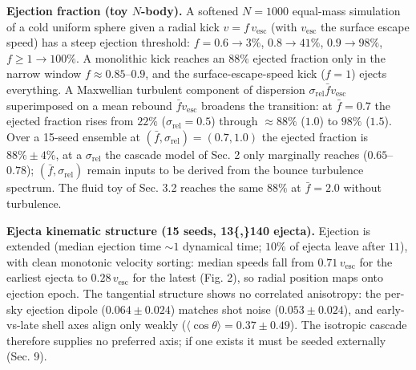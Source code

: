 \documentclass[
  11pt,
]{article}
\begin{document}
\textbf{Ejection fraction (toy \(N\)-body).} A softened \(N = 1000\)
equal-mass simulation of a cold uniform sphere given a radial kick
\(v = f\,v_{\text{esc}}\) (with \(v_{\text{esc}}\) the surface escape
speed) has a steep ejection threshold: \(f = 0.6 \to 3\%\),
\(0.8 \to 41\%\), \(0.9 \to 98\%\), \(f \geq 1 \to 100\%\). A monolithic
kick reaches an \(88\%\) ejected fraction only in the narrow window
\(f \approx 0.85\)--\(0.9\), and the surface-escape-speed kick
(\(f = 1\)) ejects everything. A Maxwellian turbulent component of
dispersion \(\sigma_{\text{rel}}\bar{f}v_{\text{esc}}\) superimposed on
a mean rebound \(\bar{f}v_{\text{esc}}\) broadens the transition: at
\(\bar{f} = 0.7\) the ejected fraction rises from \(22\%\)
(\(\sigma_{\text{rel}} = 0.5\)) through \(\approx 88\%\) (\(1.0\)) to
\(98\%\) (\(1.5\)). Over a 15-seed ensemble at
\((\bar{f}, \sigma_{\text{rel}}) = (0.7, 1.0)\) the ejected fraction is
\(88\% \pm 4\%\), at a \(\sigma_{\text{rel}}\) the cascade model of Sec.
2 only marginally reaches (\(0.65\)--\(0.78\));
\((\bar{f}, \sigma_{\text{rel}})\) remain inputs to be derived from the
bounce turbulence spectrum. The fluid toy of Sec. 3.2 reaches the same
\(88\%\) at \(\bar{f} = 2.0\) without turbulence.

\textbf{Ejecta kinematic structure (15 seeds, 13\{,\}140 ejecta).}
Ejection is extended (median ejection time \(\sim\!1\) dynamical time;
\(10\%\) of ejecta leave after \(11\)), with clean monotonic velocity
sorting: median speeds fall from \(0.71\,v_{\text{esc}}\) for the
earliest ejecta to \(0.28\,v_{\text{esc}}\) for the latest (Fig. 2), so
radial position maps onto ejection epoch. The tangential structure shows
no correlated anisotropy: the per-sky ejection dipole
(\(0.064 \pm 0.024\)) matches shot noise (\(0.053 \pm 0.024\)), and
early-vs-late shell axes align only weakly
(\(\langle\cos\theta\rangle = 0.37 \pm 0.49\)). The isotropic cascade
therefore supplies no preferred axis; if one exists it must be seeded
externally (Sec. 9).
\end{document}

